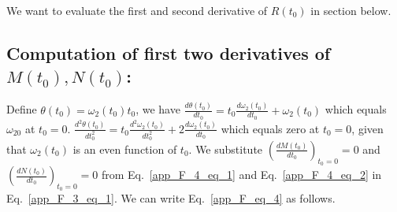 \documentclass[11pt]{elsarticle}
\begin{document}
We want to evaluate the first and second derivative of $R(t_0)$ in section below.








\subsection{\label{sec:appendix_F_3} \textbf{Computation of first two derivatives of $M(t_0), N(t_0)$:} \protect\\  \lowercase{} }



Define $\theta(t_0) = \omega_2(t_0) t_0$, we have $\frac{d\theta(t_0)}{dt_0} = t_0 \frac{d\omega_2(t_0)}{dt_0} + \omega_2(t_0)$ which equals $\omega_{20}$ at $t_0=0$.  $\frac{d^{2}\theta(t_0)}{dt_0^{2}} =  t_0 \frac{d^{2}\omega_2(t_0)}{dt_0^{2}} + 2 \frac{d\omega_2(t_0)}{dt_0}$ which equals zero at $t_0=0$, given that $\omega_2(t_0)$ is an even function of $t_0$. We substitute $(\frac{dM(t_0)}{dt_0})_{t_0=0}=0$ and $(\frac{dN(t_0)}{dt_0})_{t_0=0}=0$ from  Eq.~\ref{app_F_4_eq_1} and Eq.~\ref{app_F_4_eq_2} in Eq.~\ref{app_F_3_eq_1}. We can write Eq.~\ref{app_F_eq_4}  as follows.
\end{document}
